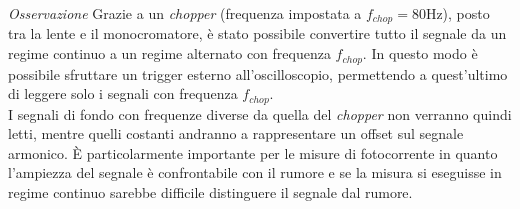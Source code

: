 \textit{Osservazione} Grazie a un \textit{chopper} (frequenza impostata a $f_{chop}=80$Hz), posto tra la lente e il monocromatore, è stato possibile convertire tutto il segnale da un regime continuo a un regime alternato con frequenza $f_{chop}$. In questo modo è possibile sfruttare un trigger esterno all'oscilloscopio, permettendo a quest'ultimo di leggere solo i segnali con frequenza $f_{chop}$.
\\I segnali di fondo con frequenze diverse da quella del \textit{chopper} non verranno quindi letti, mentre quelli costanti andranno a rappresentare un offset sul segnale armonico.
È particolarmente importante per le misure di fotocorrente in quanto l'ampiezza del segnale è confrontabile con il rumore e se la misura si eseguisse in regime continuo sarebbe difficile distinguere il segnale dal rumore.\\









